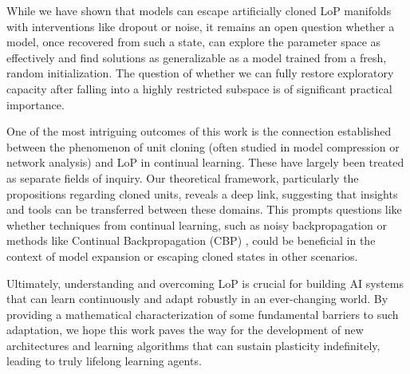 \documentclass{article}
\numberwithin{figure}{section}
\begin{document}
While we have shown that models can escape artificially cloned LoP manifolds with interventions like dropout or noise, it remains an open question whether a model, once recovered from such a state, can explore the parameter space as effectively and find solutions as generalizable as a model trained from a fresh, random initialization. The question of whether we can fully restore exploratory capacity after falling into a highly restricted subspace is of significant practical importance.

One of the most intriguing outcomes of this work is the connection established between the phenomenon of unit cloning (often studied in model compression or network analysis) and LoP in continual learning. These have largely been treated as separate fields of inquiry. Our theoretical framework, particularly the propositions regarding cloned units, reveals a deep link, suggesting that insights and tools can be transferred between these domains.  This prompts questions like whether techniques from continual learning, such as noisy backpropagation or methods like Continual Backpropagation (CBP) \citep{dohare2024loss}, could be beneficial in the context of model expansion or escaping cloned states in other scenarios.

Ultimately, understanding and overcoming LoP is crucial for building AI systems that can learn continuously and adapt robustly in an ever-changing world. By providing a mathematical characterization of some fundamental barriers to such adaptation, we hope this work paves the way for the development of new architectures and learning algorithms that can sustain plasticity indefinitely, leading to truly lifelong learning agents.




\end{document}
